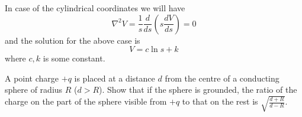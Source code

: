 \documentclass[../main.tex]{subfiles}
\begin{document}
\begin{questions}
\begin{parts}
\begin{solution}
		In case of the cylindrical coordinates we will have 
		$$
		\nabla^2 V= \frac{1}{s}\frac{d}{ds}\left(s\frac{dV}{ds}\right)=0
		$$
		and the solution for the above case is 
		$$
		V = c\ln s+k
		$$
		where $c,k$ is some constant.
	\end{solution}
\end{parts}

\question A point charge $+q$ is placed at a distance $d$ from the centre of a conducting sphere of radius $R$ ($d > R$). Show that if the sphere is grounded, the ratio of the charge on the part of the sphere visible from $+q$ to that on the rest is $\sqrt{\frac{d+R}{d-R}}$.
\begin{solution}
	\begin{center}
\end{center}
\end{solution}
\end{questions}
\end{document}
